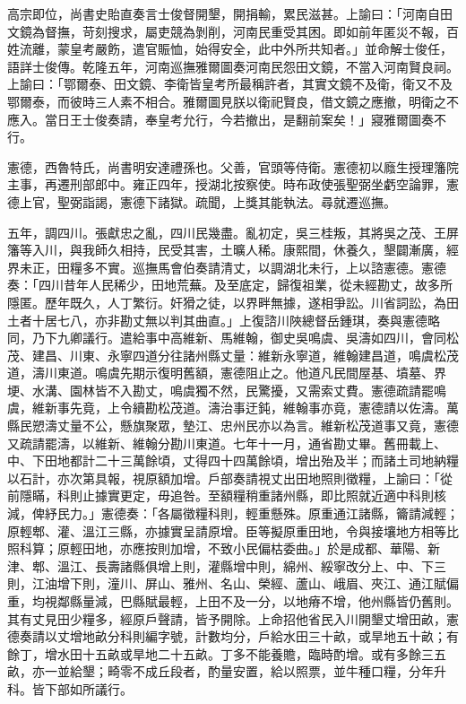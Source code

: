 \begin{pinyinscope}
高宗即位，尚書史貽直奏言士俊督開墾，開捐輸，累民滋甚。上諭曰：「河南自田文鏡為督撫，苛刻搜求，屬吏競為剝削，河南民重受其困。即如前年匿災不報，百姓流離，蒙皇考嚴飭，遣官賑恤，始得安全，此中外所共知者。」並命解士俊任，語詳士俊傳。乾隆五年，河南巡撫雅爾圖奏河南民怨田文鏡，不當入河南賢良祠。上諭曰：「鄂爾泰、田文鏡、李衛皆皇考所最稱許者，其實文鏡不及衛，衛又不及鄂爾泰，而彼時三人素不相合。雅爾圖見朕以衛祀賢良，借文鏡之應撤，明衛之不應入。當日王士俊奏請，奉皇考允行，今若撤出，是翻前案矣！」寢雅爾圖奏不行。

憲德，西魯特氏，尚書明安達禮孫也。父善，官頭等侍衛。憲德初以廕生授理籓院主事，再遷刑部郎中。雍正四年，授湖北按察使。時布政使張聖弼坐虧空論罪，憲德上官，聖弼詣謁，憲德下諸獄。疏聞，上獎其能執法。尋就遷巡撫。

五年，調四川。張獻忠之亂，四川民幾盡。亂初定，吳三桂叛，其將吳之茂、王屏籓等入川，與我師久相持，民受其害，土曠人稀。康熙間，休養久，墾闢漸廣，經界未正，田糧多不實。巡撫馬會伯奏請清丈，以調湖北未行，上以諮憲德。憲德奏：「四川昔年人民稀少，田地荒蕪。及至底定，歸復祖業，從未經勘丈，故多所隱匿。歷年既久，人丁繁衍。奸猾之徒，以界畔無據，遂相爭訟。川省詞訟，為田土者十居七八，亦非勘丈無以判其曲直。」上復諮川陜總督岳鍾琪，奏與憲德略同，乃下九卿議行。遣給事中高維新、馬維翰，御史吳鳴虞、吳濤如四川，會同松茂、建昌、川東、永寧四道分往諸州縣丈量：維新永寧道，維翰建昌道，鳴虞松茂道，濤川東道。鳴虞先期示復明舊額，憲德阻止之。他道凡民間屋基、墳墓、界埂、水溝、園林皆不入勘丈，鳴虞獨不然，民驚擾，又需索丈費。憲德疏請罷鳴虞，維新事先竟，上令續勘松茂道。濤治事迂鈍，維翰事亦竟，憲德請以佐濤。萬縣民愬濤丈量不公，懸旗聚眾，墊江、忠州民亦以為言。維新松茂道事又竟，憲德又疏請罷濤，以維新、維翰分勘川東道。七年十一月，通省勘丈畢。舊冊載上、中、下田地都計二十三萬餘頃，丈得四十四萬餘頃，增出殆及半；而諸土司地納糧以石計，亦次第具報，視原額加增。戶部奏請視丈出田地照則徵糧，上諭曰：「從前隱瞞，科則止據實更定，毋追咎。至額糧稍重諸州縣，即比照就近適中科則核減，俾紓民力。」憲德奏：「各屬徵糧科則，輕重懸殊。原重通江諸縣，籥請減輕；原輕郫、灌、溫江三縣，亦據實呈請原增。臣等擬原重田地，令與接壤地方相等比照科算；原輕田地，亦應按則加增，不致小民偏枯委曲。」於是成都、華陽、新津、郫、溫江、長壽諸縣俱增上則，灌縣增中則，綿州、綏寧改分上、中、下三則，江油增下則，潼川、屏山、雅州、名山、榮經、蘆山、峨眉、夾江、通江賦偏重，均視鄰縣量減，巴縣賦最輕，上田不及一分，以地瘠不增，他州縣皆仍舊則。其有丈見田少糧多，經原戶聲請，皆予開除。上命招他省民入川開墾丈增田畝，憲德奏請以丈增地畝分科則編字號，計數均分，戶給水田三十畝，或旱地五十畝；有餘丁，增水田十五畝或旱地二十五畝。丁多不能養贍，臨時酌增。或有多餘三五畝，亦一並給墾；畸零不成丘段者，酌量安置，給以照票，並牛種口糧，分年升科。皆下部如所議行。


\end{pinyinscope}
